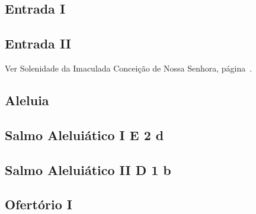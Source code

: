 \def\Prefix{communia/commune-sanctarum/}

\subsection{Entrada I}\label{subsection:communia/commune-sanctarum/introitus-1}

\AllowPageFlush

\subsection{Entrada II}\label{subsection:communia/commune-sanctarum/introitus-2}

\begin{rubrica}
  Ver Solenidade da Imaculada Conceição de Nossa Senhora, página~\pageref{subsection:proprium-sanctorum/in-conceptione-immaculata-bmv/psalmus-responsorius}.
\end{rubrica}

\subsection{Aleluia}\label{subsection:communia/commune-sanctarum/alleluia}

\AllowPageFlush

\subsection[Salmo Aleluiático I]{Salmo Aleluiático I \textmd{E 2 d}}\label{subsection:communia/commune-sanctarum/psalmus-alleluiaticus-1}

\AllowPageFlush

\subsection[Salmo Aleluiático I]{Salmo Aleluiático II \textmd{D 1 b}}\label{subsection:communia/commune-sanctarum/psalmus-alleluiaticus-2}

\AllowPageFlush

\subsection{Ofertório I}\label{subsection:communia/commune-sanctarum/offertorium-1}


